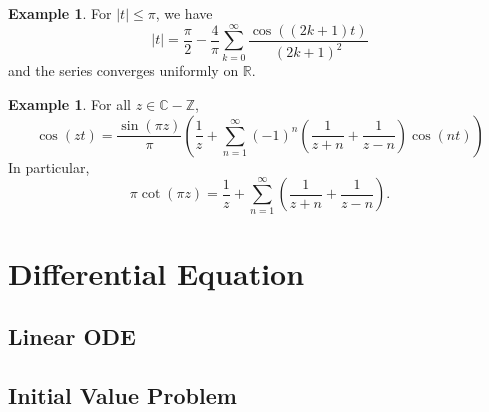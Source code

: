 \documentclass[12pt,a4paper]{book}
\newcommand{\bb}[1]{\mathbb{#1}}
\theoremstyle{definition}
\newtheorem{exam}[defn]{Example}
\begin{document}
\begin{exam}
    For $|t| \leq \pi$, we have
$$
|t|=\frac{\pi}{2}-\frac{4}{\pi} \sum_{k=0}^{\infty} \frac{\cos ((2 k+1) t)}{(2 k+1)^2}
$$
and the series converges uniformly on $\bb{R}$.
\end{exam}
\begin{exam}
For all $z\in \bb{C}-\bb{Z}$, 
$$
\cos (z t)=\frac{\sin (\pi z)}{\pi}\left(\frac{1}{z}+\sum_{n=1}^{\infty}(-1)^n\left(\frac{1}{z+n}+\frac{1}{z-n}\right) \cos (n t)\right)
$$
In particular, 
$$
\pi \cot (\pi z)=\frac{1}{z}+\sum_{n=1}^{\infty}\left(\frac{1}{z+n}+\frac{1}{z-n}\right) .
$$
\end{exam}


\chapter{Differential Equation} 
\section{Linear ODE}


\section{Initial Value Problem}
\end{document}
